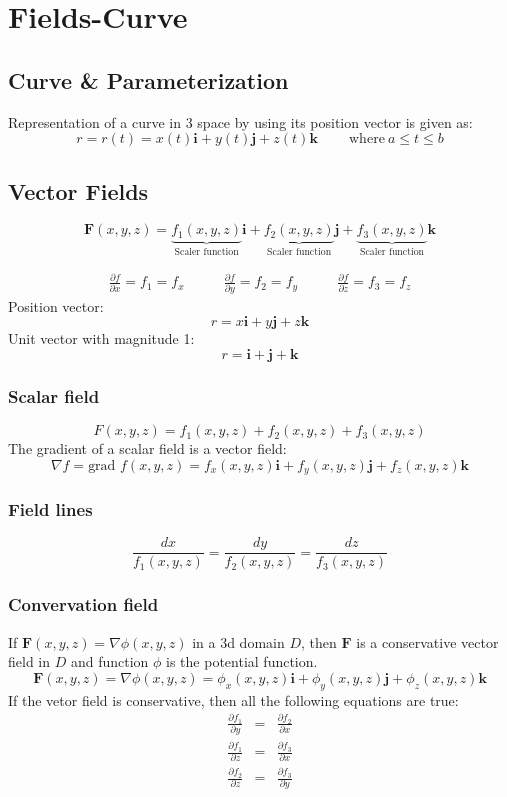 \section{Fields-Curve}
\subsection{Curve \& Parameterization}
Representation of a curve in 3 space by using its position vector is given as:
$$r=r(t)=x(t)\mathbf{i}+y(t)\mathbf{j}+z(t)\mathbf{k}\qquad{\mathrm{~where~}}a\leq t\leq b$$

\subsection{Vector Fields}
$$\mathbf{F}(x,y,z)=\underbrace{ f_{1}(x,y,z) }_{ \text{Scaler function} }\mathbf{i}
+\underbrace{ f_{2}(x,y,z) }_{ \text{Scaler function} }\mathbf{j}
+\underbrace{ f_{3}(x,y,z) }_{ \text{Scaler function} }\mathbf{k}$$

\begin{eqnarray*}
    \frac{\partial f}{\partial x}=f_1=f_x\qquad
  &\frac{\partial f}{\partial y}=f_2=f_y\qquad
  &\frac{\partial f}{\partial z}=f_3=f_z
\end{eqnarray*}
Position vector:
$$r=x\mathbf{i}+y\mathbf{j}+z\mathbf{k}$$
Unit vector with magnitude 1:
$$r=\mathbf{i}+\mathbf{j}+\mathbf{k}$$
\subsubsection{Scalar field}
$$F(x,y,z)=f_1(x,y,z)+f_2(x,y,z)+f_3(x,y,z)$$
The gradient of a scalar field is a vector field:
$$\nabla f=\text{grad } f(x,y,z)=f_x(x,y,z)\mathbf{i}+f_y(x,y,z)\mathbf{j}+f_z(x,y,z)\mathbf{k}$$

\subsubsection{Field lines}
$${\frac{d x}{f_{1}(x,y,z)}}={\frac{d y}{f_{2}(x,y,z)}}={\frac{d z}{f_{3}(x,y,z)}}$$
\subsubsection{Convervation field}
If $\mathbf{F}(x,y,z)=\nabla\phi(x,y,z)$ in a 3d domain $D$, then $\mathbf{F}$ is a conservative vector field in $D$ and function $\phi$ is the potential function.
$$\mathbf{F}(x,y,z)=\nabla\phi(x,y,z)=\phi_x(x,y,z)\mathbf{i}+\phi_y(x,y,z)\mathbf{j}+\phi_z(x,y,z)\mathbf{k}$$
If the vetor field is conservative, then all the following equations are true:
\begin{eqnarray*}
  \frac{\partial f_1}{\partial y}&=&\frac{\partial f_2}{\partial x} \\
  \frac{\partial f_1}{\partial z}&=&\frac{\partial f_3}{\partial x} \\
  \frac{\partial f_2}{\partial z}&=&\frac{\partial f_3}{\partial y} \\
\end{eqnarray*}


